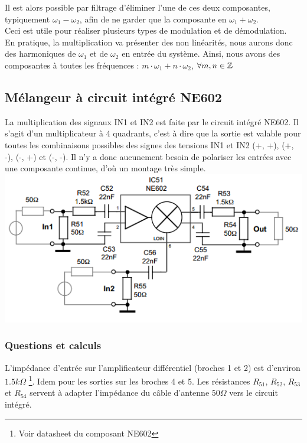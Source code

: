 \documentclass{article}
\begin{document}
Il est alors possible par filtrage d'éliminer l'une de ces deux composantes, typiquement $\omega_{1} - \omega_{2}$, afin de ne garder que la composante en $\omega_{1} + \omega_{2}$.\\

Ceci est utile pour réaliser plusieurs types de modulation et de démodulation.
\\
En pratique, la multiplication va présenter des non linéarités, nous aurons donc des harmoniques de $\omega_{1}$ et de $\omega_{2}$ en entrée du système.
Ainsi, nous avons des composantes à toutes les fréquences : $m \cdot \omega_{1} + n \cdot \omega_{2}$, $\forall m, n \in\mathbb{Z}$


\subsection{Mélangeur à circuit intégré NE602}

La multiplication des signaux IN1 et IN2 est faite par le circuit intégré NE602. 
Il s'agit d'un multiplicateur à 4 quadrants, c'est à dire que la sortie est valable pour toutes les combinaisons possibles des signes des tensions IN1 et IN2 (+, +), (+, -), (-, +) et (-, -).
Il n'y a donc aucunement besoin de polariser les entrées avec une composante continue, d'où un montage très simple.\\

\includegraphics{shema_melangeur_gilbert.png}

\subsubsection{Questions et calculs}


L'impédance d'entrée sur l'amplificateur différentiel (broches 1 et 2) est d'environ $1.5k\Omega$ \footnote{Voir datasheet du composant NE602}. Idem pour les sorties sur les broches 4 et 5.
Les résistances $R_{51}$, $R_{52}$, $R_{53}$ et $R_{54}$ servent à adapter l'impédance du câble d'antenne $50\Omega$ vers le circuit intégré.\\
\end{document}
